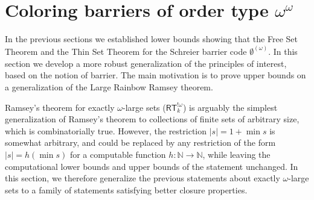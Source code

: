\documentclass[10pt,a4paper]{article}
\newcommand{\RT}[0]{\mathsf{RT}}
\newcommand{\NN}[0]{\mathbb{N}}
\numberwithin{theorem}{section}
\begin{document}
\section{Coloring barriers of order type $\omega^\omega$}\label{sec:coloring-barriers}

In the previous sections we established lower bounds showing that the Free Set Theorem and the Thin Set Theorem for the Schreier barrier code $\emptyset^{(\omega)}$. In this section we develop a more robust generalization of the principles of interest, based on the notion of barrier. The main motivation is to prove upper bounds on a generalization of the Large Rainbow Ramsey theorem. %

Ramsey's theorem for exactly $\omega$-large sets ($\RT^{!\omega}_k$) is arguably the simplest generalization of Ramsey's theorem to collections of finite sets of arbitrary size, which is combinatorially true. However, %
the restriction $|s| = 1+\min s$ is somewhat arbitrary, and could be replaced by any restriction of the form $|s| = h(\min s)$ for a computable function $h : \NN \to \NN$, while leaving the computational lower bounds and upper bounds of the statement unchanged. 
In this section, we therefore generalize the previous statements about exactly $\omega$-large sets to a family of statements satisfying better closure properties.
\end{document}
